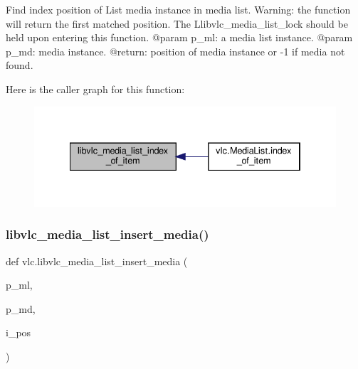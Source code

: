\begin{DoxyVerb}Find index position of List media instance in media list.
Warning: the function will return the first matched position.
The L{libvlc_media_list_lock} should be held upon entering this function.
@param p_ml: a media list instance.
@param p_md: media instance.
@return: position of media instance or -1 if media not found.
\end{DoxyVerb}
 Here is the caller graph for this function\+:
\nopagebreak
\begin{figure}[H]
\begin{center}
\leavevmode
\includegraphics[width=334pt]{namespacevlc_a69f02560a16855c9e173826e68abeecb_icgraph}
\end{center}
\end{figure}
\mbox{\label{namespacevlc_ad202a19648373b42178fdb688b342e63}} 
\subsubsection{\texorpdfstring{libvlc\+\_\+media\+\_\+list\+\_\+insert\+\_\+media()}{libvlc\_media\_list\_insert\_media()}}
{\footnotesize\ttfamily def vlc.\+libvlc\+\_\+media\+\_\+list\+\_\+insert\+\_\+media (\begin{DoxyParamCaption}\item[{}]{p\+\_\+ml,  }\item[{}]{p\+\_\+md,  }\item[{}]{i\+\_\+pos }\end{DoxyParamCaption})}

